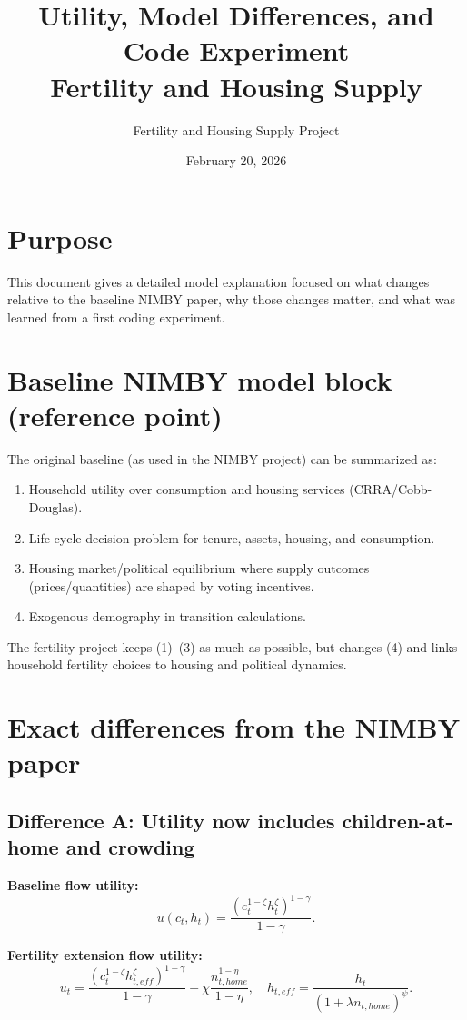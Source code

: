 \documentclass[11pt]{article}
\title{Utility, Model Differences, and Code Experiment\\Fertility and Housing Supply}
\author{Fertility and Housing Supply Project}
\date{February 20, 2026}
\begin{document}
\maketitle

\section*{Purpose}
This document gives a detailed model explanation focused on what changes relative to the baseline NIMBY paper, why those changes matter, and what was learned from a first coding experiment.

\section{Baseline NIMBY model block (reference point)}
The original baseline (as used in the NIMBY project) can be summarized as:
\begin{enumerate}
\item Household utility over consumption and housing services (CRRA/Cobb-Douglas).
\item Life-cycle decision problem for tenure, assets, housing, and consumption.
\item Housing market/political equilibrium where supply outcomes (prices/quantities) are shaped by voting incentives.
\item Exogenous demography in transition calculations.
\end{enumerate}

The fertility project keeps (1)--(3) as much as possible, but changes (4) and links household fertility choices to housing and political dynamics.

\section{Exact differences from the NIMBY paper}
\subsection*{Difference A: Utility now includes children-at-home and crowding}
\textbf{Baseline flow utility:}
\[
u(c_t,h_t)=\frac{(c_t^{1-\zeta}h_t^{\zeta})^{1-\gamma}}{1-\gamma}.
\]

\textbf{Fertility extension flow utility:}
\[
 u_t = \frac{(c_t^{1-\zeta}h_{t,eff}^{\zeta})^{1-\gamma}}{1-\gamma} + \chi\frac{n_{t,home}^{1-\eta}}{1-\eta},
\quad
h_{t,eff}=\frac{h_t}{(1+\lambda n_{t,home})^{\psi}}.
\]
\end{document}
